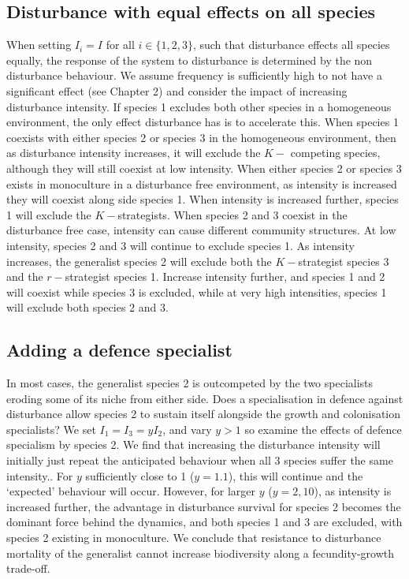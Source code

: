 \subsection{Disturbance with equal effects on all species} \label{ss:homo}
When setting $I_i=I$ for all $i \in \{1,2,3\}$, such that disturbance effects all species equally, the response of the system to disturbance is determined by the non disturbance behaviour. We assume frequency is sufficiently high to not have a significant effect (see Chapter 2) and consider the impact of increasing disturbance intensity. If species 1 excludes both other species in a homogeneous environment, the only effect disturbance has is to accelerate this. When species 1 coexists with either species 2 or species 3 in the homogeneous environment, then as disturbance intensity increases, it will exclude the $K-$ competing species, although they will still coexist at low intensity. When either species 2 or species 3 exists in monoculture in a disturbance free environment, as intensity is increased they will coexist along side species 1. When intensity is increased further, species 1 will exclude the $K-$strategists. When species 2 and 3 coexist in the disturbance free case, intensity can cause different community structures. At low intensity, species 2 and 3 will continue to exclude species 1. As intensity increases, the generalist species 2 will exclude both the $K-$strategist species 3 and the $r-$strategist species 1. Increase intensity further, and species 1 and 2 will coexist while species 3 is excluded, while at very high intensities, species 1 will exclude both species 2 and 3.

\subsection{Adding a defence specialist}
In most cases, the generalist species 2 is outcompeted by the two specialists eroding some of its niche from either side. Does a specialisation in defence against disturbance allow species 2 to sustain itself alongside the growth and colonisation specialists? We set $I_1=I_3=yI_2$, and vary $y>1$ so examine the effects of defence specialism by species 2. We find that increasing the disturbance intensity will initially just repeat the anticipated behaviour when all 3 species suffer the same intensity.. For $y$ sufficiently close to 1 ($y=1.1$), this will continue and the `expected' behaviour will occur. However, for larger $y$ ($y=2,10$), as intensity is increased further, the advantage in disturbance survival for species 2 becomes the dominant force behind the dynamics, and both species 1 and 3 are excluded, with species 2 existing in monoculture. We conclude that resistance to disturbance mortality of the generalist cannot increase biodiversity along a fecundity-growth trade-off.

